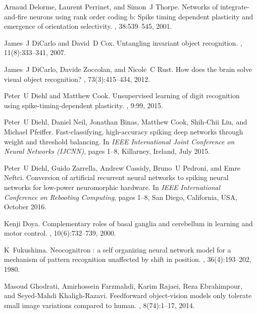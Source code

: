 \documentclass[preprint,5p,12pt,twocolumn]{article}
\begin{document}
\begin{thebibliography}{10}
Arnaud Delorme, Laurent Perrinet, and Simon~J Thorpe.
\newblock Networks of integrate-and-fire neurons using rank order coding b:
  Spike timing dependent plasticity and emergence of orientation selectivity.
, 38:539--545, 2001.

James~J DiCarlo and David~D Cox.
\newblock Untangling invariant object recognition.
, 11(8):333--341, 2007.

James~J DiCarlo, Davide Zoccolan, and Nicole~C Rust.
\newblock How does the brain solve visual object recognition?
, 73(3):415--434, 2012.

Peter~U Diehl and Matthew Cook.
\newblock Unsupervised learning of digit recognition using
  spike-timing-dependent plasticity.
, 9:99, 2015.

Peter~U Diehl, Daniel Neil, Jonathan Binas, Matthew Cook, Shih-Chii Liu, and
  Michael Pfeiffer.
\newblock Fast-classifying, high-accuracy spiking deep networks through weight
  and threshold balancing.
\newblock In {\em IEEE International Joint Conference on Neural Networks
  (IJCNN)}, pages 1--8, Killarney, Ireland, July 2015.

Peter~U Diehl, Guido Zarrella, Andrew Cassidy, Bruno~U Pedroni, and Emre
  Neftci.
\newblock Conversion of artificial recurrent neural networks to spiking neural
  networks for low-power neuromorphic hardware.
\newblock In {\em IEEE International Conference on Rebooting Computing}, pages
  1--8, San Diego, California, USA, October 2016.

Kenji Doya.
\newblock Complementary roles of basal ganglia and cerebellum in learning and
  motor control.
, 10(6):732--739, 2000.

K~Fukushima.
\newblock Neocognitron : a self organizing neural network model for a mechanism
  of pattern recognition unaffected by shift in position.
, 36(4):193--202, 1980.

Masoud Ghodrati, Amirhossein Farzmahdi, Karim Rajaei, Reza Ebrahimpour, and
  Seyed-Mahdi Khaligh-Razavi.
\newblock Feedforward object-vision models only tolerate small image variations
  compared to human.
, 8(74):1--17, 2014.


\end{thebibliography}
\end{document}
